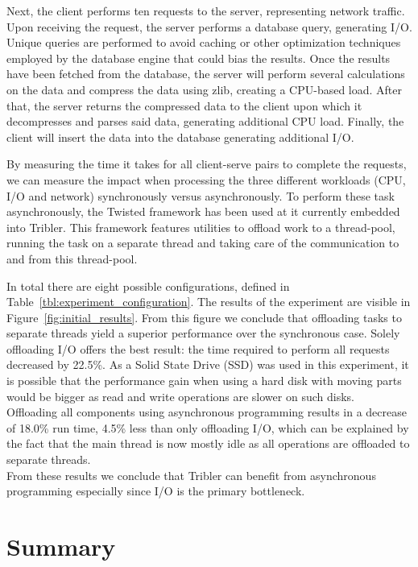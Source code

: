 Next, the client performs ten requests to the server, representing network traffic.
Upon receiving the request, the server performs a database query, generating I/O.
Unique queries are performed to avoid caching or other optimization techniques employed by the database engine that could bias the results.
Once the results have been fetched from the database, the server will perform several calculations on the data and compress the data using zlib, creating a CPU-based load.
After that, the server returns the compressed data to the client upon which it decompresses and parses said data, generating additional CPU load.
Finally, the client will insert the data into the database generating additional I/O.

By measuring the time it takes for all client-serve pairs to complete the requests, we can measure the impact when processing the three different workloads (CPU, I/O and network) synchronously versus asynchronously.
To perform these task asynchronously, the Twisted framework has been used at it currently embedded into Tribler.
This framework features utilities to offload work to a thread-pool, running the task on a separate thread and taking care of the communication to and from this thread-pool.

In total there are eight possible configurations, defined in Table~\ref{tbl:experiment_configuration}.
The results of the experiment are visible in Figure~\ref{fig:initial_results}.
From this figure we conclude that offloading tasks to separate threads yield a superior performance over the synchronous case. Solely offloading I/O offers the best result: the time required to perform all requests decreased by 22.5\%.
As a Solid State Drive (SSD) was used in this experiment, it is possible that the performance gain when using a hard disk with moving parts would be bigger as read and write operations are slower on such disks.\\
Offloading all components using asynchronous programming results in a decrease of 18.0\% run time, 4.5\% less than only offloading I/O, which can be explained by the fact that the main thread is now mostly idle as all operations are offloaded to separate threads.\\
From these results we conclude that Tribler can benefit from asynchronous programming especially since I/O is the primary bottleneck.

\section{Summary}

